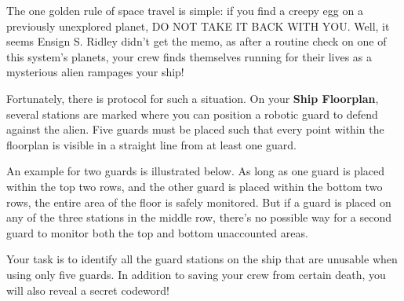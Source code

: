 The one golden rule of space travel is simple: if you find a creepy
egg on a previously unexplored planet, DO NOT TAKE IT BACK WITH YOU.
Well, it seems Ensign S. Ridley didn't get the memo, as after
a routine check on one of this system's planets, your crew finds
themselves running for their lives as a mysterious alien
rampages your ship!

Fortunately, there is protocol for such a situation. On your
\textbf{Ship Floorplan}, several stations are marked where you
can position a robotic guard to defend against the alien. 
Five guards must be placed such that every point within the floorplan
is visible in a straight line from at least one guard.

An example for two guards is illustrated below. As long as one
guard is placed within the top two rows, and the other guard is
placed within the bottom two rows, the entire area of the floor
is safely monitored. But if a guard is placed on any of the
three stations in the middle row,
there's no possible way for a second guard to monitor both
the top and bottom unaccounted areas.

Your task is to identify all the guard stations on the ship that
are unusable when using only five guards. 
In addition to saving your crew from
certain death, you will also reveal a secret codeword!

